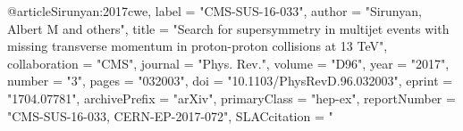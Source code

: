 @article{Sirunyan:2017cwe,
      label          = "CMS-SUS-16-033",
      author         = "Sirunyan, Albert M and others",
      title          = "{Search for supersymmetry in multijet events with missing
                        transverse momentum in proton-proton collisions at 13
                        TeV}",
      collaboration  = "CMS",
      journal        = "Phys. Rev.",
      volume         = "D96",
      year           = "2017",
      number         = "3",
      pages          = "032003",
      doi            = "10.1103/PhysRevD.96.032003",
      eprint         = "1704.07781",
      archivePrefix  = "arXiv",
      primaryClass   = "hep-ex",
      reportNumber   = "CMS-SUS-16-033, CERN-EP-2017-072",
      SLACcitation   = "%
}

